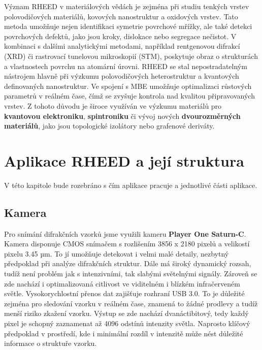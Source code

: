 \documentclass[a4paper,11pt]{article}
\begin{document}
Význam RHEED v materiálových vědách je zejména při studiu tenkých vrstev polovodičových materiálů, kovových nanostruktur a oxidových vrstev. Tato metoda umožňuje nejen identifikaci symetrie povrchové mřížky, ale také detekci povrchových defektů, jako jsou kroky, dislokace nebo segregace nečistot. V kombinaci s dalšími analytickými metodami, například rentgenovou difrakcí (XRD) či rastrovací tunelovou mikroskopií (STM), poskytuje obraz o strukturách a vlastnostech povrchu na atomární úrovni. RHEED se stal nepostradatelným nástrojem hlavně při výzkumu polovodičových heterostruktur a kvantových definovaných nanostruktur. Ve spojení s MBE umožňuje optimalizaci růstových parametrů v reálném čase, čímž se zvyšuje kontrola nad kvalitou připravovaných vrstev. Z tohoto důvodu je široce využíván ve výzkumu materiálů pro \textbf{kvantovou elektroniku}, \textbf{spintroniku} či vývoj nových \textbf{dvourozměrných materiálů}, jako jsou topologické izolátory nebo grafenové deriváty.\\

\section{Aplikace RHEED a její struktura}
    V této kapitole bude rozebráno s čím aplikace pracuje a jednotlivé části aplikace.
\subsection{Kamera}
Pro snímání difrakčních vzorků jsme využili kameru \textbf{Player One Saturn-C}. Kamera disponuje CMOS snímačem s rozlišením 3856 x 2180 pixelů a velikostí pixelu 3.45 µm. To jí umožňuje detekovat i velmi malé detaily, nezbytný předpoklad při analýze difrakčních struktur.
    Dále má široký dynamický rozsah, tudíž není problém jak s intenzivními, tak slabými světelnými signály. Zároveň se zde nachází i optimalizovaná citlivost ve viditelném i blízkém infračerveném světle.
    Vysokorychlostní přenos dat zajišťuje rozhraní USB 3.0. To je důležité zejména pro sledování vzorku v reálném čase, znamená to žádné prodlevy a tudíž menší riziko zkažení vzorku.
    Výstup se zde nachází dvanáctibitový, tedy každý pixel je schopný zaznamenat až 4096 odstínů intenzity světla. Naprosto klíčový předpoklad v prostředí, kde i minimální rozdíl v intenzitě může nést důležité informace o struktuře vzorku.
    
\end{document}

